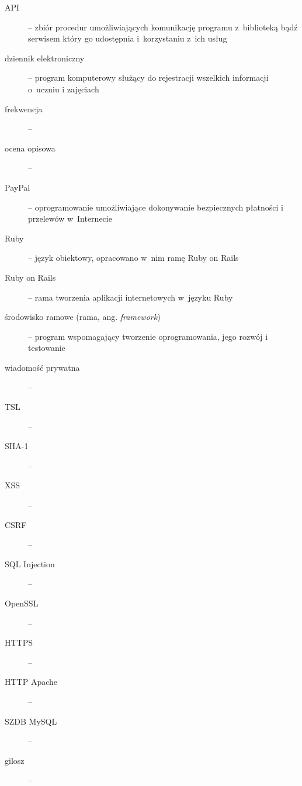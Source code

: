 \documentclass[12pt,leqno,twoside]{mwart}
\begin{document}
\begin{description}
\item[API]-- zbiór procedur umożliwiających komunikację programu z~biblioteką bądź serwisem który go udostępnia i~korzystaniu z~ich usług\\
\item[dziennik elektroniczny]-- program komputerowy służący do rejestracji wszelkich informacji o~uczniu i zajęciach\\
\item[frekwencja]-- \\
\item[ocena opisowa]-- \\
\item[PayPal]-- oprogramowanie umożliwiające dokonywanie bezpiecznych płatności i przelewów w~Internecie\\
\item[Ruby]-- język obiektowy, opracowano w~nim ramę Ruby on Rails\\
\item[Ruby on Rails]-- rama tworzenia aplikacji internetowych w~języku Ruby\\
\item[środowisko ramowe (rama, ang. \textit{framework})]-- program wspomagający tworzenie oprogramowania, jego rozwój i testowanie\\
\item[wiadomość prywatna]-- \\
\item[TSL]-- \\
\item[SHA-1]-- \\
\item[XSS]-- \\
\item[CSRF]-- \\
\item[SQL Injection]-- \\
\item[OpenSSL]-- \\
\item[HTTPS]-- \\
\item[HTTP Apache]-- \\
\item[SZDB MySQL]-- \\
\item[gilosz]-- \\

\end{description}
\end{document}
